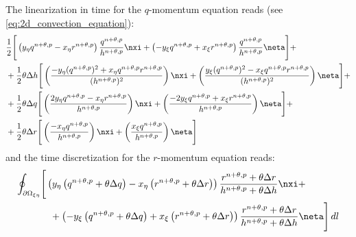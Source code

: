 The linearization in time for the $q$-momentum equation reads (see \autoref{eq:2d_convection_equation}):
%
\begin{align}
& \half \Bigg[ \left( y_\eta q^{n+\theta, p} - x_\eta r^{n+\theta, p} \right)
\frac{q^{n+\theta, p}}{h^{n+\theta, p}} \nxi
+ \left(-y_\xi q^{n+\theta, p} +
x_\xi r^{n+\theta, p} \right) \frac{q^{n+\theta, p}}{h^{n+\theta, p}} \neta \Bigg] +
\\
& + \half \theta \Delta h \Bigg[
\left( \frac{- y_\eta (q^{n+\theta, p})^2 + x_\eta {q^{n+\theta, p} r^{n+\theta, p}}}{(h^{n+\theta, p})^2} \right) \nxi+
\left( \frac{y_\xi (q^{n+\theta, p})^2 - x_\xi q^{n+\theta, p}r^{n+\theta, p} }{(h^{n+\theta, p})^2} \right) \neta
\Bigg]+
\\
& + \half \theta \Delta q \Bigg[
\left( \frac{   2y_\eta q^{n+\theta, p} - x_\eta r^{n+\theta, p}}{h^{n+\theta, p}} \right) \nxi +
\left( \frac{ - 2y_\xi  q^{n+\theta, p} + x_\xi  r^{n+\theta, p}}{h^{n+\theta, p}} \right) \neta
\Bigg] +
\\
& + \half \theta \Delta r \Bigg[
 \left( \frac{ - x_\eta q^{n+\theta, p}}{h^{n+\theta, p}} \right) \nxi +
 \left( \frac{   x_\xi  q^{n+\theta, p}}{h^{n+\theta, p}} \right) \neta
\Bigg]
\end{align}
and the time discretization for the $r$-momentum equation reads:
%
\begin{align}
    \oint_{\partial\Omega_{\xi\eta}} & \Bigg[ \left( y_{\eta}\left(q^{n+\theta, p} + \theta \Delta q\right) - x_{\eta} \left(r^{n+\theta, p} + \theta \Delta r\right) \right) \frac{r^{n+\theta, p} + \theta \Delta r}{h^{n+\theta, p} + \theta \Delta h}  \nxi +
    \nonumber \\*
    &\quad + \left( -y_{\xi}\left(q^{n+\theta, p} + \theta \Delta q\right)  + x_{\xi}\left(r^{n+\theta, p} + \theta \Delta r\right)\right) \frac{r^{n+\theta, p} + \theta \Delta r}{h^{n+\theta, p} + \theta \Delta h} \neta \Bigg] \, dl
\end{align}
